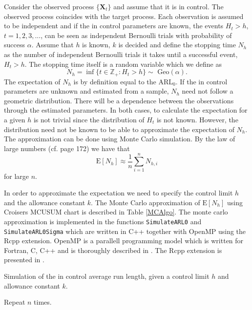 Consider the observed process $\{\mathbf{X}_t\}$ and assume that it is in control. The observed process coincides with the target process. Each observation is assumed to be independent and if the in control parameters are known, the events $H_t > h$, $t=1,2,3,...$, can be seen as independent Bernoulli trials with probability of success $\alpha$. Assume that $h$ is known, $k$ is decided and define the stopping time $N_h$ as the number of independent Bernoulli trials it takes until a successful event, $H_t > h$. The stopping time itself is a random variable which we define as
$$
N_h=\inf\{t\in \mathbb{Z}_+: H_t>h\} \sim \text{ Geo}(\alpha).
$$
The expectation of $N_h$ is by definition equal to the ARL$_0$. If the in control parameters are unknown and estimated from a sample, $N_h$ need not follow a geometric distribution. There will be a dependence between the observations through the estimated parameters. In both cases, to calculate the expectation for a given $h$ is not trivial since the distribution of $H_t$ is not known. However, the distribution need not be known to be able to approximate the expectation of $N_h$. The approximation can be done using Monte Carlo simulation. By the law of large numbers (cf. \citet{LLN} page 172) we have that
$$
\text{E}[N_h] \approx \frac{1}{n} \sum_{i=1}^n N_{h,i}
$$
for large $n$. 

In order to approximate the expectation we need to specify the control limit $h$ and the allowance constant $k$. The Monte Carlo approximation of $\text{E}[N_h]$ using Croisers MCUSUM chart is described in Table \ref{MCAlgo}. The monte carlo approximation is implemented in the functions \texttt{SimulateARL0} and \texttt{SimulateARL0Sigma} which are written in C++ together with OpenMP using the Rcpp extension. OpenMP is a parallell programming model which is written for Fortran, C, C++ and is thoroughly described in \citet{OpenMP}. The Rcpp extension is presented in \citet{Rcpp}. 
\begin{algorithm}
\caption{Simulation of the in control average run length, given a control limit $h$ and allowance constant $k$.\label{MCAlgo}}
\BlankLine
{}
Repeat $n$ times.
\end{algorithm}

